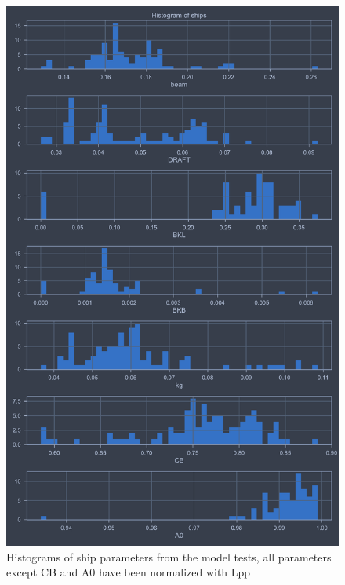 \begin{figure}[H]
    \centering
    \includegraphics[width=0.9\columnwidth]{figures/ship_parameters.pdf}
    \caption{Histograms of ship parameters from the model tests, all parameters except CB and A0 have been normalized with Lpp}
    \label{fig:ship_parameters}
\end{figure}